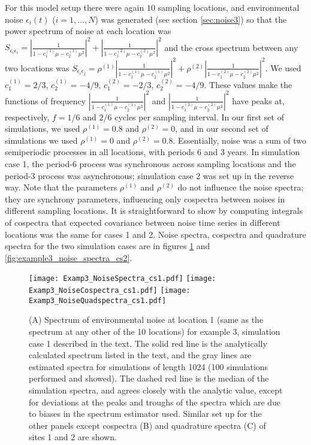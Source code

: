 \documentclass[letterpaper,11pt]{article}
\begin{document}
For this model setup there were again $10$ sampling locations, and environmental
noise $\epsilon_i(t)$ ($i=1,\ldots,N$) was generated (see section \ref{sec:noise3})
so that the power spectrum of noise at each location was 
$S_{\epsilon_i \epsilon_i} = \left| \frac{1}{1-c_1^{(1)} \mu -c_2^{(1)} \mu^2} \right|^2+
\left| \frac{1}{1-c_1^{(2)} \mu -c_2^{(2)} \mu^2} \right|^2$ and the cross spectrum between any two locations was $S_{\epsilon_i \epsilon_j} = \rho^{(1)} \left| \frac{1}{1-c_1^{(1)} \mu -c_2^{(1)} \mu^2} \right|^2+
\rho^{(2)} \left| \frac{1}{1-c_1^{(2)} \mu -c_2^{(2)} \mu^2} \right|^2$.
We used $c_1^{(1)}=2/3$, $c_2^{(1)}=-4/9$, $c_1^{(2)}=-2/3$, $c_2^{(2)}=-4/9$.
These values make the functions of frequency $\left| \frac{1}{1-c_1^{(1)} \mu -c_2^{(1)} \mu^2} \right|^2$ and $\left| \frac{1}{1-c_1^{(2)} \mu -c_2^{(2)} \mu^2} \right|^2$
have peaks at, respectively, $f=1/6$ and $2/6$ cycles per sampling interval.
In our first set of simulations, we used $\rho^{(1)}=0.8$ and $\rho^{(2)}=0$,
and in our second set of simulations we used $\rho^{(1)}=0$ and $\rho^{(2)}=0.8$.
Essentially, noise was a sum of two semiperiodic processes in all locations, with 
periods 6 and 3 years. In simulation case 1, the period-6 process was 
synchronous across sampling locations and the period-3 process was asynchronous; 
simulation case 2 was set up in the reverse way. Note that the parameters
$\rho^{(1)}$ and $\rho^{(2)}$ do not influence the noise spectra; they are synchrony
parameters, influencing only cospectra between noises in different sampling 
locations. It is straightforward to show by computing integrals of 
cospectra that expected covariance between noise time series in different locations
was the same for cases 1 and 2. Noise spectra, cospectra and quadrature spectra
for the two simulation cases are in figures \ref{fig:example3_noise_spectra_cs1} and
\ref{fig:example3_noise_spectra_cs2}.

\begin{figure}
\texttt{[image: Examp3\_NoiseSpectra\_cs1.pdf]}
\texttt{[image: Examp3\_NoiseCospectra\_cs1.pdf]}
\texttt{[image: Examp3\_NoiseQuadspectra\_cs1.pdf]}
\caption{(A) Spectrum of environmental noise at location 1 (same as the spectrum at any other of the 10 locations) for example 3, simulation case 1 described in the text. The solid red line is the analytically calculated spectrum listed in the text, and the gray lines are estimated spectra for simulations of length 1024 (100 simulations performed and showed). The dashed red line is the median of the simulation spectra, and agrees closely with the analytic value, except for deviations at the peaks and troughs of the spectra which are due to biases in the spectrum estimator used. Similar set up for the other panels except cospectra (B) and quadrature spectra (C) of sites 1 and 2 are shown.}\label{fig:example3_noise_spectra_cs1}
\end{figure}
\end{document}
